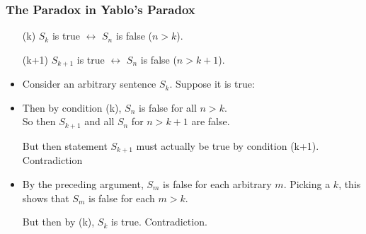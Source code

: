 \begin{frame}
\frametitle{The Paradox in Yablo's Paradox}

\begin{itemize}[<+->]

\item[(k)] \(S_k\) is true $\leftrightarrow$ \(S_n\)  is false (\(n>k\)).
\item[(k+1)] \(S_{k+1}\) is true $\leftrightarrow$ \(S_n\)  is false (\(n>k+1\)).

\item Consider an arbitrary sentence \(S_k\). Suppose it is true:

\item Then by condition (k), $S_n$ is false for all $n> k$. \\ So then $S_{k+1}$ and all $S_n$ for $n > k+1$ are false. 
\item[] But then statement $S_{k+1}$ must actually be true by condition (k+1). Contradiction

\item By the preceding argument, $S_m$ is false for each arbitrary $m$. Picking a $k$, this shows that $S_m$ is false for each $m>k$. 
\item[] But then by (k), $S_k$ is true. Contradiction. 

\end{itemize}
\end{frame}

